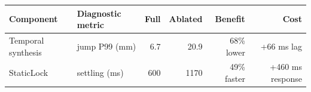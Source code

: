 \begin{tabular}{llrrrr}
\toprule
Component & Diagnostic metric & Full & Ablated & Benefit & Cost \\
\midrule
Temporal synthesis & jump P99 (mm) & 6.7 & 20.9 & 68\% lower & +66 ms lag \\
StaticLock & settling (ms) & 600 & 1170 & 49\% faster & +460 ms response \\
\bottomrule
\end{tabular}
